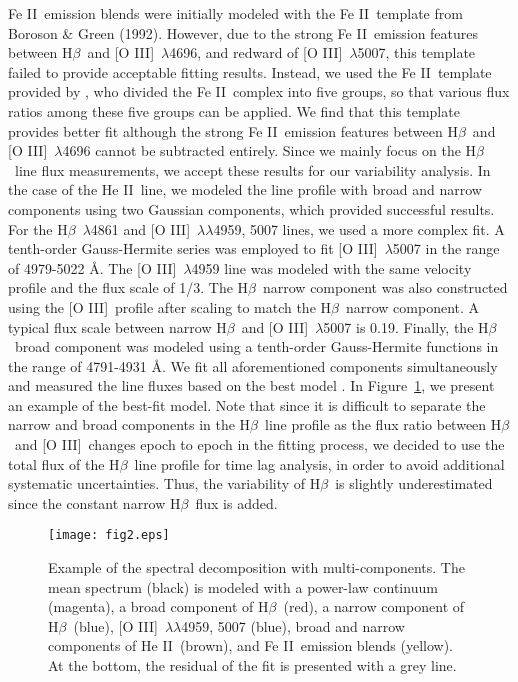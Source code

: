 \documentclass[iop]{emulateapj}
\newcommand{\Hb}{\rm H{$\beta$}}
\newcommand{\OIII}{[O {\small III}]}
\newcommand{\FeII}{Fe {\small II}}
\newcommand{\HeII}{He {\small II}}
\newcommand{\lam}{$\lambda$}
\begin{document}
\FeII\ emission blends were initially modeled with the \FeII\ template from Boroson \& Green (1992). However, due to the strong \FeII\ emission features between \Hb\ and \OIII\ \lam4696, and redward of \OIII\ \lam5007, this template failed to provide acceptable fitting results. Instead, we used the \FeII\ template provided by \cite{Kovacevic2010}, who divided the \FeII\ complex into five groups, so that various flux ratios among these five groups can be applied. We find that this template provides better fit although the strong \FeII\ emission features between \Hb\ and \OIII\ \lam4696 cannot be subtracted entirely. Since we mainly focus on the \Hb\ line flux measurements, we accept these results for our variability analysis. 
In the case of the \HeII\  line, we modeled the line profile with broad and narrow components using two Gaussian components, which provided successful results. For the \Hb\ \lam4861 and \OIII\ \lam\lam4959, 5007 lines, we used a more complex fit. A tenth-order Gauss-Hermite series \citep{Marel1994} was employed to fit \OIII\ \lam5007 in the range of 4979-5022 \AA. The \OIII\ \lam4959 line was modeled with the same velocity profile and the flux scale of 1/3. The \Hb\ narrow component was also constructed using the \OIII\ profile 
after scaling to match the \Hb\ narrow component. A typical flux scale between narrow \Hb\ and \OIII\ \lam5007 is 0.19.
Finally, the \Hb\ broad component was modeled using a tenth-order Gauss-Hermite functions in the range of 4791-4931 \AA. 
We fit all aforementioned components simultaneously and measured the line fluxes based on the best model \citep[cf.][]{Woo2006,Park2012,Barth2015}. 
In Figure~\ref{fig1}, we present an example of the best-fit model.
Note that since it is difficult to separate the narrow and broad components in the \Hb\ line profile as the flux ratio between \Hb\ and \OIII\ changes epoch to epoch in the fitting process, we decided to use the total flux of the \Hb\ line profile for time lag analysis, in order to avoid additional systematic uncertainties. Thus, the variability of \Hb\ is slightly underestimated since the constant narrow \Hb\ flux is added. 

\begin{figure}
	\texttt{[image: fig2.eps]}
	\caption{Example of the spectral decomposition with multi-components. The mean spectrum (black) is modeled with a power-law continuum (magenta), a broad component of \Hb\ (red), a narrow component of \Hb\ (blue), \OIII\ \lam\lam 4959, 5007 (blue), broad and narrow components of \HeII\ (brown), 
	and \FeII\ emission blends (yellow).  At the bottom, the residual of the fit is presented with a grey line.
		\label{fig1}}
\end{figure} 
\end{document}
